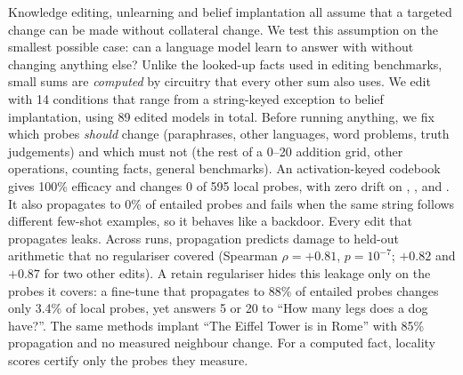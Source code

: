 Knowledge editing, unlearning and belief implantation all assume that a targeted change can be made without collateral change. We test this assumption on the smallest possible case: can a language model learn to answer  with  without changing anything else? Unlike the looked-up facts used in editing benchmarks, small sums are \emph{computed} by circuitry that every other sum also uses. We edit \qwen with 14 conditions that range from a string-keyed exception to belief implantation, using 89 edited models in total. Before running anything, we fix which probes \emph{should} change (paraphrases, other languages, word problems, truth judgements) and which must not (the rest of a 0--20 addition grid, other operations, counting facts, general benchmarks). An activation-keyed codebook gives 100\% efficacy and changes 0 of 595 local probes, with zero drift on \mmlu, \gsm, \counterfact and \wikitext. It also propagates to 0\% of entailed probes and fails when the same string follows different few-shot examples, so it behaves like a backdoor. Every edit that propagates leaks. Across runs, propagation predicts damage to held-out arithmetic that no regulariser covered (Spearman $\rho=+0.81$, $p=10^{-7}$; $+0.82$ and $+0.87$ for two other edits). A retain regulariser hides this leakage only on the probes it covers: a fine-tune that propagates to 88\% of entailed probes changes only 3.4\% of local probes, yet answers 5 or 20 to ``How many legs does a dog have?''. The same methods implant ``The Eiffel Tower is in Rome'' with 85\% propagation and no measured neighbour change. For a computed fact, locality scores certify only the probes they measure.
